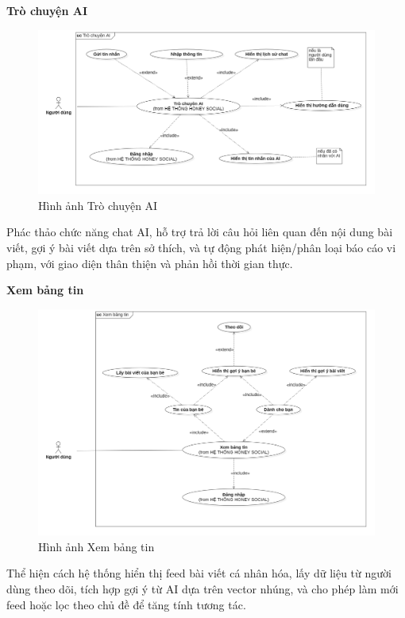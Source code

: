 \textbf{Trò chuyện AI} \\
\begin{figure}[H]
    \centering
    \includegraphics[width=1\textwidth]{image/MoHinh/7.png}
    \caption{Hình ảnh Trò chuyện AI}
    \label{fig:tro_chuyen_ai}
\end{figure}
Phác thảo chức năng chat AI, hỗ trợ trả lời câu hỏi liên quan đến nội dung bài viết, gợi ý bài viết dựa trên sở thích, và tự động phát hiện/phân loại báo cáo vi phạm, với giao diện thân thiện và phản hồi thời gian thực.

\newpage
\textbf{Xem bảng tin} \\
\begin{figure}[H]
    \centering
    \includegraphics[width=1\textwidth]{image/MoHinh/8.png}
    \caption{Hình ảnh Xem bảng tin}
    \label{fig:xem_bang_tin}
\end{figure}
Thể hiện cách hệ thống hiển thị feed bài viết cá nhân hóa, lấy dữ liệu từ người dùng theo dõi, tích hợp gợi ý từ AI dựa trên vector nhúng, và cho phép làm mới feed hoặc lọc theo chủ đề để tăng tính tương tác.

